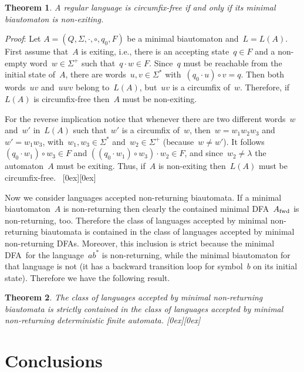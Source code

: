 \documentclass[submission]{eptcs}
\newcommand{\dfa}{\textrm{DFA}}
\newcommand{\fwd}{{\textnormal{fwd}}}
\newcommand*{\qed}{\raisebox{0.5ex}[0ex][0ex]{\framebox[1ex][l]{}}}
\newtheorem{theorem}{Theorem}
\newenvironment{proof}{\par\noindent
  {\rmfamily\itshape\mdseries Proof\/}:\hspace{\labelsep}\ignorespaces}{\mbox{}\nolinebreak\hfill~{\qed}
  \medbreak
}
\begin{document}
\begin{theorem}\label{thm:dbia-non-exiting-iff-circumfix-free}
  A regular language is circumfix-free if and only if its \emph{minimal}
  biautomaton is non-exiting.
\end{theorem}

\begin{proof}
  Let $A=(Q,\Sigma,\cdot,\circ,q_0,F)$ be a minimal biautomaton
  and~$L=L(A)$.  First assume that~$A$ is exiting, i.e., there is an
  accepting state~$q\in F$ and a non-empty word~$w\in\Sigma^+$ such
  that~$q\cdot w\in F$.  Since~$q$ must be reachable from the initial
  state of~$A$, there are words~$u,v\in\Sigma^*$ with~$(q_0\cdot
  u)\circ v= q$.  Then both words~$uv$ and~$uwv$ belong to~$L(A)$,
  but~$uv$ is a circumfix of~$w$.  Therefore, if~$L(A)$ is
  circumfix-free then~$A$ must be non-exiting.

  For the reverse implication notice that whenever there are two
  different words~$w$ and~$w'$ in~$L(A)$ such that~$w'$ is a circumfix
  of~$w$, then~$w=w_1w_2w_3$ and~$w'=w_1w_3$,
  with~$w_1,w_3\in\Sigma^*$ and~$w_2\in\Sigma^+$ (because~$w\neq w'$).
  It follows $(q_0\cdot w_1)\circ w_3\in F$ and $((q_0\cdot w_1)\circ
  w_3)\cdot w_2\in F$, and since~$w_2\neq\lambda$ the automaton~$A$
  must be exiting.  Thus, if~$A$ is non-exiting then~$L(A)$ must be
  circumfix-free.
\end{proof}

Now we consider languages accepted non-returning biautomata.  If a
minimal biautomaton~$A$ is non-returning then clearly the contained
minimal \dfa~$A_\fwd$ is non-returning, too.  Therefore the class of
languages accepted by minimal non-returning biautomata is contained in
the class of languages accepted by minimal non-returning \dfa s.
Moreover, this inclusion is strict because the minimal \dfa\ for the
language~$ab^*$ is non-returning, while the minimal biautomaton for
that language is not (it has a backward transition loop for symbol~$b$
on its initial state).  Therefore we have the following result.

\begin{theorem}
  The class of languages accepted by \emph{minimal} non-returning biautomata
  is strictly contained in the class of languages accepted by \emph{minimal}
  non-returning deterministic finite automata. \hfill \qed
\end{theorem}

\section{Conclusions}
\label{sec:conclusions}
\end{document}
